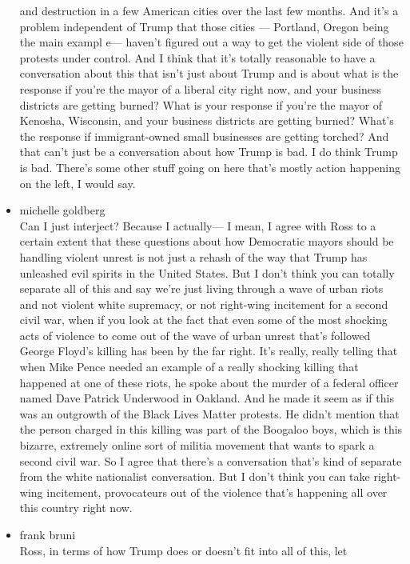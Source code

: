 \begin{itemize}
  and destruction in a few American cities over the last few months. And
  it's a problem independent of Trump that those cities --- Portland,
  Oregon being the main exampl e--- haven't figured out a way to get the
  violent side of those protests under control. And I think that it's
  totally reasonable to have a conversation about this that isn't just
  about Trump and is about what is the response if you're the mayor of a
  liberal city right now, and your business districts are getting
  burned? What is your response if you're the mayor of Kenosha,
  Wisconsin, and your business districts are getting burned? What's the
  response if immigrant-owned small businesses are getting torched? And
  that can't just be a conversation about how Trump is bad. I do think
  Trump is bad. There's some other stuff going on here that's mostly
  action happening on the left, I would say.
\item
  michelle goldberg\\
  Can I just interject? Because I actually--- I mean, I agree with Ross
  to a certain extent that these questions about how Democratic mayors
  should be handling violent unrest is not just a rehash of the way that
  Trump has unleashed evil spirits in the United States. But I don't
  think you can totally separate all of this and say we're just living
  through a wave of urban riots and not violent white supremacy, or not
  right-wing incitement for a second civil war, when if you look at the
  fact that even some of the most shocking acts of violence to come out
  of the wave of urban unrest that's followed George Floyd's killing has
  been by the far right. It's really, really telling that when Mike
  Pence needed an example of a really shocking killing that happened at
  one of these riots, he spoke about the murder of a federal officer
  named Dave Patrick Underwood in Oakland. And he made it seem as if
  this was an outgrowth of the Black Lives Matter protests. He didn't
  mention that the person charged in this killing was part of the
  Boogaloo boys, which is this bizarre, extremely online sort of militia
  movement that wants to spark a second civil war. So I agree that
  there's a conversation that's kind of separate from the white
  nationalist conversation. But I don't think you can take right-wing
  incitement, provocateurs out of the violence that's happening all over
  this country right now.
\item
  frank bruni\\
  Ross, in terms of how Trump does or doesn't fit into all of this, let

\end{itemize}
